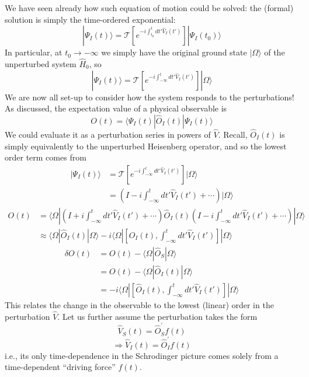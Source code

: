 We have seen already how such equation of motion could be solved: the (formal) solution is simply the time-ordered exponential:
\[ |\Psi _I\left( t \right) \rangle =\mathcal{T} \left[ e^{-i\int_{t_0}^t{dt'\hat{V}_I\left( t' \right)}} \right] |\Psi _I\left( t_0 \right) \rangle \]
In particular, at $t_0\to -\infty$ we simply have the original ground state $|\Omega\rangle$ of the unperturbed system $\hat{H}_0$, so
\[ |\Psi _I\left( t \right) \rangle =\mathcal{T} \left[ e^{-i\int_{-\infty}^t{dt'\hat{V}_I\left( t' \right)}} \right] |\Omega \rangle \]
We are now all set-up to consider how the system responds to the perturbations! As discussed, the expectation value of a physical observable is
\[ O\left( t \right) =\langle \Psi _I\left( t \right) |\hat{O}_I\left( t \right) |\Psi _I\left( t \right) \rangle \]
We could evaluate it as a perturbation series in powers of $\hat{V}$. Recall, $\hat{O}_I(t)$ is simply equivalently to the unperturbed Heisenberg operator, and so the lowest order term comes from
\begin{align*}
    |\Psi _I\left( t \right) \rangle &=\mathcal{T} \left[ e^{-i\int_{-\infty}^t{dt'\hat{V}_I\left( t' \right)}} \right] |\Omega \rangle \\
    &=\left( I-i\int_{-\infty}^t{dt'\hat{V}_I\left( t' \right)}+\cdots \right) |\Omega \rangle
\end{align*}
\begin{align*}
    O\left( t \right) &=\langle \Omega |\left( I+i\int_{-\infty}^t{dt'\hat{V}_I\left( t' \right)}+\cdots \right) \hat{O}_I\left( t \right) \left( I-i\int_{-\infty}^t{dt'\hat{V}_I\left( t' \right)}+\cdots \right) |\Omega \rangle \\
    &\approx \langle \Omega |\hat{O}_I\left( t \right) |\Omega \rangle -i\langle \Omega |\left[ \hat{O}_I\left( t \right) ,\int_{-\infty}^t{dt'\hat{V}_I\left( t' \right)} \right] |\Omega \rangle
\end{align*}
\begin{align*}
    \delta O\left( t \right) &=O\left( t \right) -\langle \Omega |\hat{O}_S|\Omega \rangle \\
    &=O\left( t \right) -\langle \Omega |\hat{O}_I\left( t \right) |\Omega \rangle \\
    &=-i\langle \Omega |\left[ \hat{O}_I\left( t \right) ,\int_{-\infty}^t{dt'\hat{V}_I\left( t' \right)} \right] |\Omega \rangle
\end{align*}
This relates the change in the observable to the lowest (linear) order in the perturbation $\hat{V}$. Let us further assume the perturbation takes the form
\[ \hat{V}_S\left( t \right) =\hat{O}_{S}^{'}f\left( t \right) \]
\[ \Rightarrow \hat{V}_I\left( t \right) =\hat{O}_{I}^{'}f\left( t \right) \]
i.e., its only time-dependence in the Schrodinger picture comes solely from a time-dependent ``driving force'' $f(t)$.

